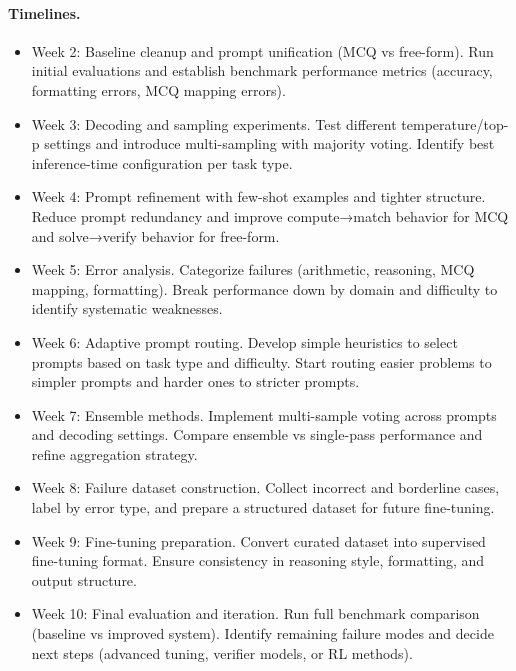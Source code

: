 \documentclass{article}
\begin{document}
\paragraph{Timelines.}
\begin{itemize}
    \item Week 2: Baseline cleanup and prompt unification (MCQ vs free-form). Run initial evaluations and establish benchmark performance metrics (accuracy, formatting errors, MCQ mapping errors).

    \item Week 3: Decoding and sampling experiments. Test different temperature/top-p settings and introduce multi-sampling with majority voting. Identify best inference-time configuration per task type.
    
    \item Week 4: Prompt refinement with few-shot examples and tighter structure. Reduce prompt redundancy and improve compute→match behavior for MCQ and solve→verify behavior for free-form.
    
    \item Week 5: Error analysis. Categorize failures (arithmetic, reasoning, MCQ mapping, formatting). Break performance down by domain and difficulty to identify systematic weaknesses.
    
    \item Week 6: Adaptive prompt routing. Develop simple heuristics to select prompts based on task type and difficulty. Start routing easier problems to simpler prompts and harder ones to stricter prompts.
    
    \item Week 7: Ensemble methods. Implement multi-sample voting across prompts and decoding settings. Compare ensemble vs single-pass performance and refine aggregation strategy.
    
    \item Week 8: Failure dataset construction. Collect incorrect and borderline cases, label by error type, and prepare a structured dataset for future fine-tuning.
    
    \item Week 9: Fine-tuning preparation. Convert curated dataset into supervised fine-tuning format. Ensure consistency in reasoning style, formatting, and output structure.
    
    \item Week 10: Final evaluation and iteration. Run full benchmark comparison (baseline vs improved system). Identify remaining failure modes and decide next steps (advanced tuning, verifier models, or RL methods).
\end{itemize}
\end{document}
